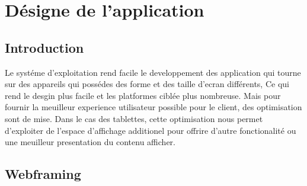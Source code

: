 
\chapter{Désigne de l'application}
\section{Introduction}
Le systéme d'exploitation \android rend facile le developpement des application qui tourne sur des appareils qui possédes des forme et des taille d'ecran différents, Ce qui rend le desgin plus facile et les platformes ciblée plus nombreuse. %
Mais pour fournir la meuilleur experience utilisateur possible pour le client, des optimisation sont de mise. Dans le cas des tablettes, cette optimisation nous permet d'exploiter de l'espace d'affichage additionel pour offrire d'autre fonctionalité ou une meuilleur presentation du contenu afficher.

\section{Webframing}